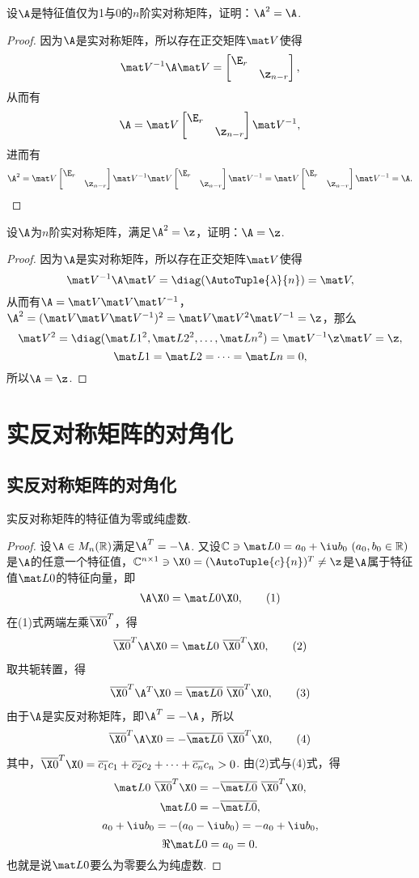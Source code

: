 \begin{example}
设\(\A\)是特征值仅为1与0的\(n\)阶实对称矩阵，证明：\(\A^2=\A\).
\begin{proof}
\def\M{\begin{bmatrix} \E_r \\ & \z_{n-r} \end{bmatrix}}%
因为\(\A\)是实对称矩阵，所以存在正交矩阵\(\Q\)使得\[
\Q^{-1}\A\Q = \M,
\]从而有\[
\A = \Q\M\Q^{-1},
\]进而有\[
\A^2 = \Q\M\Q^{-1}\Q\M\Q^{-1} = \Q\M\Q^{-1} = \A.
\qedhere
\]
\end{proof}
\end{example}

\begin{example}
设\(\A\)为\(n\)阶实对称矩阵，满足\(\A^2=\z\)，证明：\(\A=\z\).
\begin{proof}
因为\(\A\)是实对称矩阵，所以存在正交矩阵\(\Q\)使得\[
\Q^{-1}\A\Q = \diag(\AutoTuple{\lambda}{n}) = \V,
\]从而有\(\A = \Q\V\Q^{-1}\)，\(\A^2 = (\Q\V\Q^{-1})^2 = \Q\V^2\Q^{-1} = \z\)，那么\[
\V^2 = \diag(\L{1}^2,\L{2}^2,\dotsc,\L{n}^2) = \Q^{-1}\z\Q = \z,
\]\[
\L{1}=\L{2}=\dotsb=\L{n} = 0,
\]所以\(\A=\z\).
\end{proof}
\end{example}

\section{实反对称矩阵的对角化}
\subsection{实反对称矩阵的对角化}
\begin{theorem}
实反对称矩阵的特征值为零或纯虚数.
\begin{proof}
设\(\A \in M_n(\mathbb{R})\)满足\(\A^T=-\A\).
又设\(\mathbb{C} \ni \L0 = a_0 + \iu b_0\ (a_0,b_0 \in \mathbb{R})\)是\(\A\)的任意一个特征值，\(\mathbb{C}^{n \times 1} \ni \X0=(\AutoTuple{c}{n})^T \neq \z\)是\(\A\)属于特征值\(\L0\)的特征向量，即\begin{gather}
\A\X0 = \L0\X0, \tag1
\end{gather}在(1)式两端左乘\(\overline{\X0}^T\)，得\begin{gather}
\overline{\X0}^T \A \X0
= \L0\ \overline{\X0}^T \X0, \tag2
\end{gather}
取共轭转置，得\begin{gather}
\overline{\X0}^T \A^T \X0
= \overline{\L0}\ \overline{\X0}^T \X0, \tag3
\end{gather}
由于\(\A\)是实反对称矩阵，即\(\A^T = -\A\)，所以\begin{gather}
\overline{\X0}^T \A \X0
= -\overline{\L0}\ \overline{\X0}^T \X0, \tag4
\end{gather}其中，\(\overline{\X0}^T \X0 = \overline{c_1}c_1 + \overline{c_2}c_2 + \dotsb + \overline{c_n}{c_n} > 0\).
由(2)式与(4)式，得\[
\L0\ \overline{\X0}^T \X0
= -\overline{\L0}\ \overline{\X0}^T \X0,
\]\[
\L0 = -\overline{\L0},
\]\[
a_0 + \iu b_0 = -(a_0 - \iu b_0) = -a_0 + \iu b_0,
\]\[
\Re \L0 = a_0 = 0.
\]
也就是说\(\L0\)要么为零要么为纯虚数.
\end{proof}
\end{theorem}

